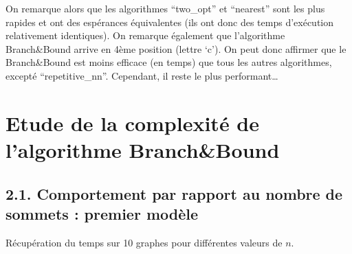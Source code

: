 \documentclass[
]{article}
\newenvironment{Shaded}{\begin{snugshade}}{\end{snugshade}}
\newcommand{\ControlFlowTok}[1]{\textcolor[rgb]{0.13,0.29,0.53}{\textbf{#1}}}
\newcommand{\DataTypeTok}[1]{\textcolor[rgb]{0.13,0.29,0.53}{#1}}
\newcommand{\DecValTok}[1]{\textcolor[rgb]{0.00,0.00,0.81}{#1}}
\newcommand{\KeywordTok}[1]{\textcolor[rgb]{0.13,0.29,0.53}{\textbf{#1}}}
\newcommand{\NormalTok}[1]{#1}
\newcommand{\OperatorTok}[1]{\textcolor[rgb]{0.81,0.36,0.00}{\textbf{#1}}}
\newcommand{\StringTok}[1]{\textcolor[rgb]{0.31,0.60,0.02}{#1}}
\begin{document}
On remarque alors que les algorithmes ``two\_opt'' et ``nearest'' sont
les plus rapides et ont des espérances équivalentes (ils ont donc des
temps d'exécution relativement identiques). On remarque également que
l'algorithme Branch\&Bound arrive en 4ème position (lettre `c'). On peut
donc affirmer que le Branch\&Bound est moins efficace (en temps) que
tous les autres algorithmes, excepté ``repetitive\_nn''. Cependant, il
reste le plus performant\ldots{}

\hypertarget{etude-de-la-complexituxe9-de-lalgorithme-branchbound}{%
\section{Etude de la complexité de l'algorithme
Branch\&Bound}\label{etude-de-la-complexituxe9-de-lalgorithme-branchbound}}

\hypertarget{comportement-par-rapport-au-nombre-de-sommets-premier-moduxe8le}{%
\subsection{2.1. Comportement par rapport au nombre de sommets : premier
modèle}\label{comportement-par-rapport-au-nombre-de-sommets-premier-moduxe8le}}

Récupération du temps sur 10 graphes pour différentes valeurs de \(n\).

\begin{Shaded}
\end{Shaded}
\end{document}
